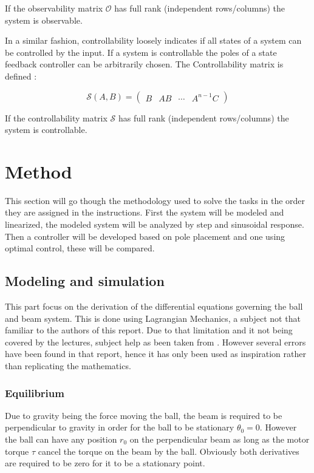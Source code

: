 \documentclass[a4paper, titlepage]{article}
\begin{document}
If the observability matrix $\mathcal{O}$ has full rank (independent rows/columns) the system is observable.

In a similar fashion, controllability loosely indicates if all states of a system can be controlled by the input. If a system is controllable the poles of a state feedback controller can be arbitrarily chosen.
The Controllability matrix is defined \citep[p.~45]{glad00}:

\begin{equation}
\mathcal{S}(A,B) = 
\begin{pmatrix}
B & AB & \cdots & A^{n-1}C
\end{pmatrix}
\label{equ:ctrb}
\end{equation}

If the controllability matrix $\mathcal{S}$ has full rank (independent rows/columns) the system is controllable.

\section{Method}
This section will go though the methodology used to solve the tasks in the order they are assigned in the instructions.
First the system will be modeled and linearized, the modeled system will be analyzed by step and sinusoidal response.
Then a controller will be developed based on pole placement and one using optimal control, these will be compared.

\subsection{Modeling and simulation}
This part focus on the derivation of the differential equations governing the ball and beam system.
This is done using Lagrangian Mechanics, a subject not that familiar to the authors of this report.
Due to that limitation and it not being covered by the lectures, subject help as been taken from \citep{BolvarVincenty2014ModellingTB}.
However several errors have been found in that report, hence it has only been used as inspiration rather than replicating the mathematics.

\subsubsection{Equilibrium}
Due to gravity being the force moving the ball, the beam is required to be perpendicular to gravity in order for the ball to be stationary $\theta_0 = 0$.
However the ball can have any position $r_0$ on the perpendicular beam as long as the motor torque $\tau$ cancel the torque on the beam by the ball.
Obviously both derivatives are required to be zero for it to be a stationary point.
\end{document}
